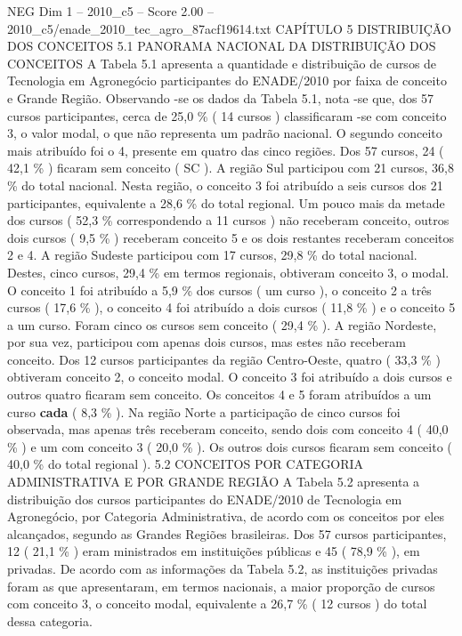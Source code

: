 \begin{textsample}{NEG Dim 1 – 2010\_c5 – Score 2.00 – 2010\_c5/enade\_2010\_tec\_agro\_87acf19614.txt}  \label{ex:f1_neg_302}
CAPÍTULO 5 DISTRIBUIÇÃO DOS CONCEITOS 5.1 PANORAMA NACIONAL DA DISTRIBUIÇÃO DOS CONCEITOS A Tabela 5.1 apresenta a quantidade e distribuição de cursos de Tecnologia em Agronegócio participantes do ENADE/2010 por faixa de conceito e Grande Região.
Observando -se os dados da Tabela 5.1, nota -se que, dos 57 cursos participantes, cerca de 25,0 \% ( 14 cursos ) classificaram -se com conceito 3, o valor modal, o que não representa um padrão nacional.
O segundo conceito mais atribuído foi o 4, presente em quatro das cinco regiões.
Dos 57 cursos, 24 ( 42,1 \% ) ficaram sem conceito ( SC ).
A região Sul participou com 21 cursos, 36,8 \% do total nacional.
Nesta região, o conceito 3 foi atribuído a seis cursos dos 21 participantes, equivalente a 28,6 \% do total regional.
Um pouco mais da metade dos cursos ( 52,3 \% correspondendo a 11 cursos ) não receberam conceito, outros dois cursos ( 9,5 \% ) receberam conceito 5 e os dois restantes receberam conceitos 2 e 4.
A região Sudeste participou com 17 cursos, 29,8 \% do total nacional.
Destes, cinco cursos, 29,4 \% em termos regionais, obtiveram conceito 3, o modal.
O conceito 1 foi atribuído a 5,9 \% dos cursos ( um curso ), o conceito 2 a três cursos ( 17,6 \% ), o conceito 4 foi atribuído a dois cursos ( 11,8 \% ) e o conceito 5 a um curso.
Foram cinco os cursos sem conceito ( 29,4 \% ).
A região Nordeste, por sua vez, participou com apenas dois cursos, mas estes não receberam conceito.
Dos 12 cursos participantes da região Centro-Oeste, quatro ( 33,3 \% ) obtiveram conceito 2, o conceito modal.
O conceito 3 foi atribuído a dois cursos e outros quatro ficaram sem conceito.
Os conceitos 4 e 5 foram atribuídos a um curso \textbf{cada} ( 8,3 \% ).
Na região Norte a participação de cinco cursos foi observada, mas apenas três receberam conceito, sendo dois com conceito 4 ( 40,0 \% ) e um com conceito 3 ( 20,0 \% ).
Os outros dois cursos ficaram sem conceito ( 40,0 \% do total regional ). 5.2 CONCEITOS POR CATEGORIA ADMINISTRATIVA E POR GRANDE REGIÃO A Tabela 5.2 apresenta a distribuição dos cursos participantes do ENADE/2010 de Tecnologia em Agronegócio, por Categoria Administrativa, de acordo com os conceitos por eles alcançados, segundo as Grandes Regiões brasileiras.
Dos 57 cursos participantes, 12 ( 21,1 \% ) eram ministrados em instituições públicas e 45 ( 78,9 \% ), em privadas.
De acordo com as informações da Tabela 5.2, as instituições privadas foram as que apresentaram, em termos nacionais, a maior proporção de cursos com conceito 3, o conceito modal, equivalente a 26,7 \% ( 12 cursos ) do total dessa categoria.

\end{textsample}
